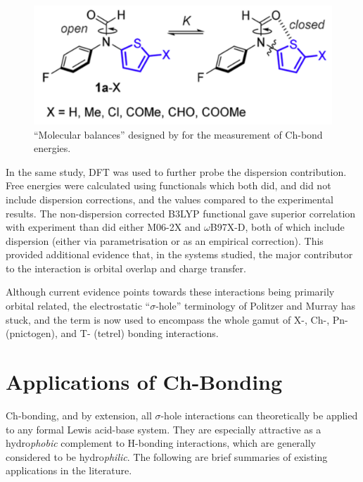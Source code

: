 \begin{refsection}
\begin{figure}
    \centering
    \includegraphics[width=0.6\linewidth]{Figures/cockroft-balances.pdf}
    \caption[``Molecular balances'' for the measurement of Ch-bond energies.]{``Molecular balances'' designed by \citeauthor{Pascoe2017} for the measurement of Ch-bond energies.\autocite{Pascoe2017}}\label{fig:cockroft-balances}
\end{figure}

In the same study, DFT was used to further probe the dispersion contribution.
Free energies were calculated using functionals which both did, and did not include dispersion corrections, and the values compared to the experimental results.
The non-dispersion corrected B3LYP functional gave superior correlation with experiment than did either M06-2X and $ \omega $B97X-D, both of which include dispersion (either via parametrisation or as an empirical correction).
This provided additional evidence that, in the systems studied, the major contributor to the interaction is orbital overlap and charge transfer.

Although current evidence points towards these interactions being primarily orbital related, the electrostatic ``$ \sigma $-hole'' terminology of Politzer and Murray has stuck, and the term is now used to encompass the whole gamut of X-, Ch-, Pn- (pnictogen), and T- (tetrel) bonding interactions.

\section{Applications of Ch-Bonding}
Ch-bonding, and by extension, all $ \sigma $-hole interactions can theoretically be applied to any formal Lewis acid-base system.
They are especially attractive as a hydro\emph{phobic} complement to H-bonding interactions, which are generally considered to be hydro\emph{philic}.
The following are brief summaries of existing applications in the literature.


\end{refsection}
